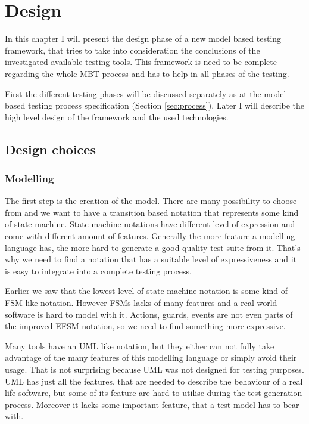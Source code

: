 \chapter{Design}
\label{cha:design}

In this chapter I will present the design phase of a new model based testing framework, that tries to take into consideration the conclusions of the investigated available testing tools. This framework is need to be complete regarding the whole MBT process and has to help in all phases of the testing.

First the different testing phases will be discussed separately as at the model based testing process specification (Section \ref{sec:process}). Later I will describe the high level design of the framework and the used technologies.

\section{Design choices}
\label{sec:designchoices}

\subsection{Modelling}
\label{sub:designmodelling}

The first step is the creation of the model. There are many possibility to choose from and we want to have a transition based notation that represents some kind of state machine. State machine notations have different level of expression and come with different amount of features. Generally the more feature a modelling language has, the more hard to generate a good quality test suite from it. That's why we need to find a notation that has a suitable level of expressiveness and it is easy to integrate into a complete testing process.

Earlier we saw that the lowest level of state machine notation is some kind of FSM like notation. However FSMs lacks of many features and a real world software is hard to model with it. Actions, guards, events are not even parts of the improved EFSM notation, so we need to find something more expressive.

Many tools have an UML like notation, but they either can not fully take advantage of the many features of this modelling language or simply avoid their usage. That is not surprising because UML was not designed for testing purposes. UML has just all the features, that are needed to describe the behaviour of a real life software, but some of its feature are hard to utilise during the test generation process. Moreover it lacks some important feature, that a test model has to bear with.

